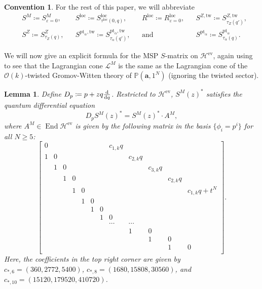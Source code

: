 \documentclass[10pt]{amsart}
\newtheorem{lem}[thm]{Lemma}
\theoremstyle{definition}
\newtheorem{conv}[thm]{Convention}
\theoremstyle{remark}
\theoremstyle{plain}
\theoremstyle{definition}
\theoremstyle{remark}
\newcommand{\ba}{\mathbf{a}}
\renewcommand{\P}{\mathbb{P}}
\newcommand{\ep}{\varepsilon}
\newcommand{\msc}[1]{\mathscr{#1}}
\newcommand{\mr}[1]{\mathrm{#1}}
\newcommand{\1}{\mathbf{1}}
\newcommand{\2}{\mathbf{2}}
\newcommand{\3}{\mathbf{3}}
\newcommand{\pt}{\mr{pt}}
\newcommand{\loc}{\mr{loc}}
\newcommand{\tw}{\mr{tw}}
\DeclareMathOperator{\End}{End}
\DeclareMathOperator{\ev}{ev}
\numberwithin{equation}{section}
\begin{document}
\begin{conv}
    For the rest of this paper, we will abbreviate 
    \begin{align*}
        &S^M \coloneqq S_{\ep=0}^M, && S^{\loc} \coloneqq S^{\loc}_{\tau^{\loc}(0,q)}, && R^{\loc} \coloneqq R^{\loc}_{\ep=0}, && S^{Z, \tw} \coloneqq S^{Z,\tw}_{\tau_{Z}(q')}, \\ 
        &S^{Z} \coloneqq S^{Z}_{\tau_{Z}(q)}, && S^{\pt_{\alpha}, \tw} \coloneqq S_{\tau_{\alpha}(q')}^{\pt_{\alpha},\tw},  && \text{and } && S^{\pt_{\alpha}} \coloneqq S_{\tau_{\alpha}(q)}^{\pt_{\alpha}}. 
    \end{align*}
\end{conv}

We will now give an explicit formula for the MSP $S$-matrix on $\msc{H}^{\ev}$, again using~ to see that the Lagrangian cone $\msc{L}^M$ is the same as the Lagrangian cone of the $\msc{O}(k)$-twisted Gromov-Witten theory of $\P(\ba, 1^N)$ (ignoring the twisted sector).
\begin{lem}\label{lem:quantumconnection}
    Define $D_p \coloneqq p + z q \odv{}{q}$. Restricted to $\msc{H}^{\ev}$, $S^M(z)^*$ satisfies the quantum differential equation
    \[ D_p S^M(z)^* = S^M(z)^* \cdot A^M, \]
    where $A^M \in \End \msc{H}^{\ev}$ is given by the following matrix in the basis $\{\phi_i = p^i\}$ for all $N \geq 5$:
    \[ \begin{bmatrix}
        0 & & & & & & &  c_{1,k} q \\
        1 & 0 & & & & & & & c_{2,k} q \\
        & 1 & 0 & & & & & & & c_{3,k} q \\
        & & 1 & 0 & & & & & & & c_{2,k} q \\
        & & & 1 & 0 & & & & & & & c_{1,k} q + t^N \\
        & & & & 1 & 0 \\
        & & & & & 1 & 0 \\
        & & & & & & 1 & 0 \\
        & & & & & & & \cdots & \cdots \\
        & & & & & & & & 1 & 0 \\
        & & & & & & & & & 1 & 0 \\
        & & & & & & & & & & 1 & 0 \\
    \end{bmatrix}.
    \]
    Here, the coefficients in the top right corner are given by $c_{*,6} = (360,2772,5400)$, $c_{*,8} = (1680, 15808, 30560)$, and $c_{*,10} = (15120, 179520, 410720)$.
\end{lem}
\end{document}
